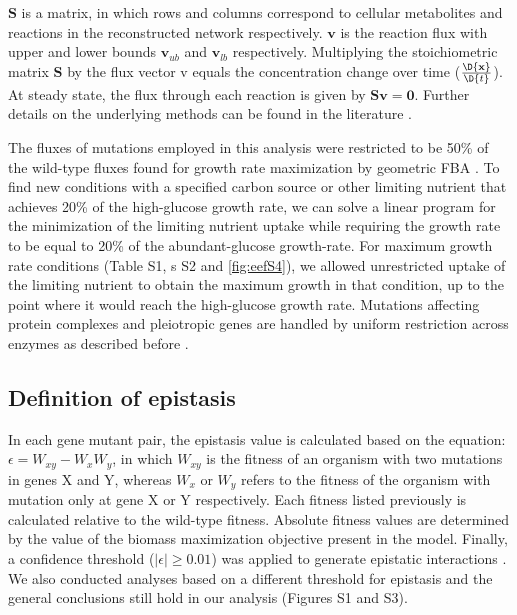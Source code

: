 $\mathbf{S}$ is a matrix, in which rows and columns correspond to
cellular metabolites and reactions in the reconstructed network
respectively. $\mathbf{v}$ is the reaction flux with upper and lower
bounds $\mathbf{v}_{ub}$ and $\mathbf{v}_{lb}$
respectively. Multiplying the stoichiometric matrix $\mathbf{S}$ by
the flux vector v equals the concentration change over time
($\frac{\D{\mathbf{x}}}{\D{t}}$). At steady state, the flux through
each reaction is given by $\mathbf{Sv} = \mathbf{0}$. Further details
on the underlying methods can be found in the literature 
\citep{Xu2012, Smallbone2009a, He2010}.

The fluxes of mutations employed in this analysis were restricted to
be 50\% of the wild-type fluxes found for growth rate maximization by
geometric FBA \citep{He2010}. To find new conditions with a specified carbon
source or other limiting nutrient that achieves 20\% of the
high-glucose growth rate, we can solve a linear program for the
minimization of the limiting nutrient uptake while requiring the
growth rate to be equal to 20\% of the abundant-glucose
growth-rate. For maximum growth rate conditions (Table S1, \Fig s S2
and \ref{fig:eefS4}), we allowed unrestricted uptake of the limiting nutrient to
obtain the maximum growth in that condition, up to the point where it
would reach the high-glucose growth rate. Mutations affecting protein
complexes and pleiotropic genes are handled by uniform restriction
across enzymes as described before \citep{Xu2012}.

\subsection{Definition of epistasis}

In each gene mutant pair, the epistasis value is calculated based on
the equation: $\epsilon = W_{xy} - W_xW_y$, in which $W_{xy}$ is the
fitness of an organism with two mutations in genes X and Y, whereas
$W_{x}$ or $W_{y}$ refers to the fitness of the organism with mutation
only at gene X or Y respectively. Each fitness listed previously is
calculated relative to the wild-type fitness. Absolute fitness values
are determined by the value of the biomass maximization objective
present in the model. Finally, a confidence threshold
($\left|\epsilon\right| \geq 0.01$) was applied to generate epistatic
interactions \citep{Xu2012, Costanzo2010, He2010}. We also conducted
analyses based on a different threshold for epistasis and the general
conclusions still hold in our analysis (Figures S1 and S3).

